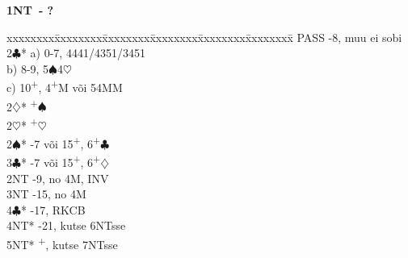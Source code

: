 \documentclass[10pt]{article}
\renewcommand{\c}{$\clubsuit$}
\renewcommand{\d}{$\diamondsuit$}
\newcommand{\h}{$\heartsuit$}
\newcommand{\s}{$\spadesuit$}
\newcommand{\p}{\textsuperscript{+}}
\newenvironment{bidtable}[1][]
{\textbf{#1}
  \begin{adjustwidth}{1em}{}
    \addvspace{2pt}
    \begin{tabbing}
      xxxxxxxx\=xxxxxxxx\=xxxxxxxx\=xxxxxxxx\=xxxxxxxx\=xxxxxxxx\=\kill}
{\end{tabbing}\end{adjustwidth}\bigskip}%
\begin{document}
\begin{multicols*}{2}
\begin{bidtable}[1NT\ - ?]
PASS   -8, muu ei sobi        \\
2\c*   \> a) 0-7, 4441/4351/3451  \\
       \> b) 8-9, 5\s 4\h         \\
       \> c) 10\p, 4\p M või 54MM \\
2\d*   {}\p\s                   \\
2\h*   {}\p\h                   \\
2\s*   {}-7 või 15\p, 6\p\c     \\
3\c*   {}-7 või 15\p, 6\p\d     \\
2NT    -9, no 4M, INV         \\
3NT    -15, no 4M            \\
4\c*   {}-17, RKCB             \\
4NT*   -21, kutse 6NTsse     \\
5NT*   \p, kutse 7NTsse
\end{bidtable}


\end{multicols*}
\end{document}
